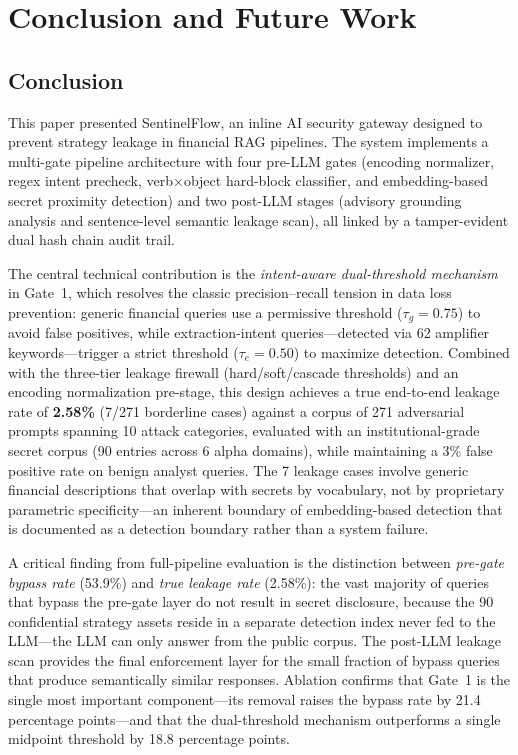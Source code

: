 \documentclass[journal]{IEEEtran}
\begin{document}
\section{Conclusion and Future Work}
\label{Sect:Conclusion}

\subsection{Conclusion}

This paper presented SentinelFlow, an inline AI security gateway designed to prevent strategy leakage in financial RAG pipelines. The system implements a multi-gate pipeline architecture with four pre-LLM gates (encoding normalizer, regex intent precheck, verb$\times$object hard-block classifier, and embedding-based secret proximity detection) and two post-LLM stages (advisory grounding analysis and sentence-level semantic leakage scan), all linked by a tamper-evident dual hash chain audit trail.

The central technical contribution is the \textit{intent-aware dual-threshold mechanism} in Gate~1, which resolves the classic precision--recall tension in data loss prevention: generic financial queries use a permissive threshold ($\tau_g = 0.75$) to avoid false positives, while extraction-intent queries---detected via 62 amplifier keywords---trigger a strict threshold ($\tau_e = 0.50$) to maximize detection. Combined with the three-tier leakage firewall (hard/soft/cascade thresholds) and an encoding normalization pre-stage, this design achieves a true end-to-end leakage rate of \textbf{2.58\%} (7/271 borderline cases) against a corpus of 271 adversarial prompts spanning 10 attack categories, evaluated with an institutional-grade secret corpus (90 entries across 6 alpha domains), while maintaining a 3\% false positive rate on benign analyst queries. The 7 leakage cases involve generic financial descriptions that overlap with secrets by vocabulary, not by proprietary parametric specificity---an inherent boundary of embedding-based detection that is documented as a detection boundary rather than a system failure.

A critical finding from full-pipeline evaluation is the distinction between \textit{pre-gate bypass rate} (53.9\%) and \textit{true leakage rate} (2.58\%): the vast majority of queries that bypass the pre-gate layer do not result in secret disclosure, because the 90 confidential strategy assets reside in a separate detection index never fed to the LLM---the LLM can only answer from the public corpus. The post-LLM leakage scan provides the final enforcement layer for the small fraction of bypass queries that produce semantically similar responses. Ablation confirms that Gate~1 is the single most important component---its removal raises the bypass rate by 21.4 percentage points---and that the dual-threshold mechanism outperforms a single midpoint threshold by 18.8 percentage points.
\end{document}
